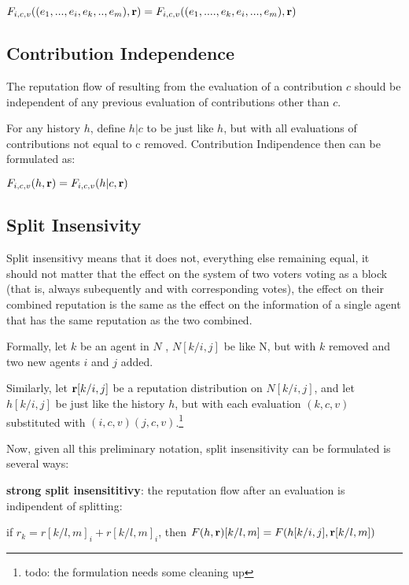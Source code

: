 \documentclass{article}
\begin{document}
\begin{center}
$F_{i,c,v}((e_1, ..., e_i, e_k, .. , e_m), {\bf r}) = F_{i,c,v}((e_1, ...., e_k, e_i, ... , e_m), {\bf r})$
 

\end{center}

\subsection{Contribution Independence}

The reputation flow of resulting from the evaluation of a contribution $c$ should be independent of any previous evaluation of contributions other than $c$.

For any history $h$, define $h | c$ to be just like $h$, but with all evaluations of contributions not equal to c removed. Contribution Indipendence then can be formulated as:

\begin{center}
$F_{i,c,v}(h, {\bf r}) = F_{i,c,v}(h|c, {\bf r}) $
\end{center}

\subsection{Split Insensivity}

Split insensitivy means that it does not, everything else remaining equal, it should not matter that the effect on the system of two voters voting as a block (that is, always subequently and with corresponding votes), the effect on their combined reputation is the same as the effect on the information of a single agent that has the same reputation as the two combined.

Formally, let $k$ be an agent in $N$ , $N[k/{i,j}]$ be like N, but with $k$ removed and two new agents $i$ and $j$ added.

Similarly, let ${\bf r}[k/{i,j}]$ be a reputation distribution on $N[k/{i,j}]$, and let $h[k/{i,j}]$ be just like the history $h$, but with each evaluation $(k, c, v)$ substituted with $(i, c, v) (j, c, v)$.\footnote{todo: the formulation needs some cleaning up}

Now, given all this preliminary notation, split insensitivity can be formulated is several ways:

{\bf strong split insensititivy}: the reputation flow after an evaluation is indipendent of splitting:
\begin{center}
if $r_k = r[k/{l,m}]_i +r[k/{l,m}]_i$, then $F(h, {\bf r})[k/{l, m}] = F(h[k/{i,j}], {\bf r}[k/{l,m}])$
\end{center}
\end{document}

